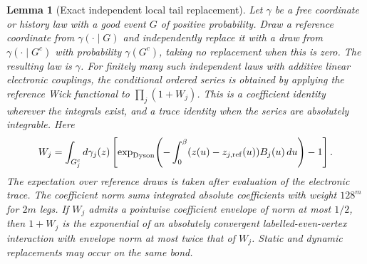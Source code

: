 \documentclass[11pt]{article}
\newtheorem{lemma}{Lemma}
\begin{document}
\begin{lemma}[Exact independent local tail replacement]\label{lem:tails}
Let $\gamma$ be a free coordinate or history law with a good event $G$ of positive probability. Draw a reference coordinate from $\gamma(\cdot\mid G)$ and independently replace it with a draw from $\gamma(\cdot\mid G^c)$ with probability $\gamma(G^c)$, taking no replacement when this is zero. The resulting law is $\gamma$. For finitely many such independent laws with additive linear electronic couplings, the conditional ordered series is obtained by applying the reference Wick functional to $\prod_j(1+W_j)$. This is a coefficient identity wherever the integrals exist, and a trace identity when the series are absolutely integrable. Here
\begin{equation}\label{eq:replace}
 W_j=\int_{G_j^c}d\gamma_j(z)\left[
 \exp_{\rm Dyson}\!\left(-\int_0^\beta (z(u)-z_{j,\rm ref}(u))B_j(u)\,du\right)-1\right].
\end{equation}
The expectation over reference draws is taken after evaluation of the electronic trace. The coefficient norm sums integrated absolute coefficients with weight $128^m$ for $2m$ legs. If $W_j$ admits a pointwise coefficient envelope of norm at most $1/2$, then $1+W_j$ is the exponential of an absolutely convergent labelled-even-vertex interaction with envelope norm at most twice that of $W_j$. Static and dynamic replacements may occur on the same bond.
\end{lemma}
\end{document}
